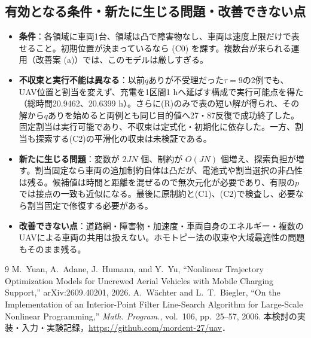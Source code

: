 \documentclass[uplatex,dvipdfmx,a4paper,11pt,jafont=haranoaji]{bxjsarticle}
\newcommand{\answerpart}[1]{\par\Needspace{6\baselineskip}\subsection*{#1}}
\begin{document}
\answerpart{有効となる条件・新たに生じる問題・改善できない点}
\begin{itemize}
  \item \textbf{条件}：各領域に車両1台、領域は凸で障害物なし、車両は速度上限だけで表せること。初期位置が決まっているなら (C0) を課す。複数台が来られる運用（改善案 (a)）では、このモデルは厳しすぎる。
  \item \textbf{不収束と実行不能は異なる}：以前$q$ありが不受理だった$\tau=9$の2例でも、UAV位置と割当を変えず、充電を1区間1 hへ延ばす構成で実行可能点を得た（総時間20.9462、20.6399 h）。さらに(R)のみで表の短い解が得られ、その解から$q$ありを始めると両例とも同じ目的値へ27・87反復で成功終了した。固定割当は実行可能であり、不収束は定式化・初期化に依存した。一方、割当も探索する(C2)の平滑化の収束は未検証である。
  \item \textbf{新たに生じる問題}：変数が $2JN$ 個、制約が $O(JN)$ 個増え、探索負担が増す。割当固定なら車両の追加制約自体は凸だが、電池式や割当選択の非凸性は残る。候補値は時間と距離を混ぜるので無次元化が必要であり、有限の$p$では接点の一致も近似になる。最後に原制約と(C1)、(C2)で検査し、必要なら割当固定で修復する必要がある。
  \item \textbf{改善できない点}：道路網・障害物・加速度・車両自身のエネルギー・複数のUAVによる車両の共用は扱えない。ホモトピー法の収束や大域最適性の問題もそのまま残る。
\end{itemize}

\FloatBarrier
{\small\renewcommand{\Needspace}[1]{}%
\begin{thebibliography}{9}
 M.~Yuan, A.~Adane, J.~Humann, and Y.~Yu, ``Nonlinear Trajectory Optimization Models for Uncrewed Aerial Vehicles with Mobile Charging Support,'' arXiv:2609.40201, 2026.
 A.~W\"achter and L.~T.~Biegler, ``On the Implementation of an Interior-Point Filter Line-Search Algorithm for Large-Scale Nonlinear Programming,'' \textit{Math. Program.}, vol.~106, pp.~25--57, 2006.
 本検討の実装・入力・実験記録，\url{https://github.com/mordent-27/uav}．
\end{thebibliography}}
\end{document}
